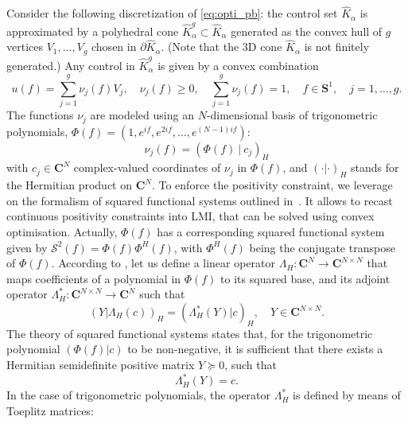 \documentclass[AMA,STIX1COL]{WileyNJD-v2}
\begin{document}
Consider the following %
discretization of \eqref{eq:opti_pb}: the control set $\hat{K}_{\alpha}$
is approximated by a polyhedral cone $\hat{K}^g_\alpha \subset \hat{K}_{\alpha}$
generated as the convex hull of $g$ vertices $V_1, \ldots, V_g$ chosen in $\partial \hat{K}_{\alpha}$.
(Note that the 3D cone $\hat{K}_\alpha$ is not finitely generated.)
Any control in $\hat{K}^g_\alpha$ is given by a convex combination
\begin{equation} \label{eq:u_trigo}
	u(f) = \sum_{j = 1}^{g} \nu_j(f) V_j, \quad
	\nu_j(f) \geq 0,\quad \sum_{j=1}^g  \nu_j(f)=1,\quad f \in \mathbf{S}^1,\quad j = 1,\ldots,g.
\end{equation}	
The functions $\nu_j$ are modeled using an $N$-dimensional basis of trigonometric polynomials, $\Phi(f) = \left(1, e^{i f}, e^{2 i f} , \ldots , e^{(N - 1) i f} \right)$:
\begin{equation}
	\label{eq:uj_nesterov}
	\nu_j(f) = \left( \Phi(f) \ |  \ c_j \right) _H 
\end{equation}
with $c_j \in \mathbf{C}^N$ complex-valued coordinates of $\nu_j$ in $\Phi(f)$, and $\left( \cdot | \cdot \right)_H$ stands for the Hermitian product on $\mathbf{C}^N$. To enforce the positivity constraint, we leverage on the formalism of squared functional systems outlined in~\cite{Nesterov_2000}. It allows to recast continuous positivity constraints into \ac{LMI}, that can be solved using convex optimisation.
%
Actually, $\Phi(f)$ has a corresponding squared functional system given by $\mathcal{S}^2(f) = \Phi(f) \Phi^H(f)$, with $\Phi^H(f)$ being the conjugate transpose of $\Phi(f)$. According to \cite{Nesterov_2000}, let us define a linear operator $\Lambda_H: \mathbf{C}^{N } \rightarrow \mathbf{C}^{N\times N}$  that maps coefficients of a polynomial in $\Phi(f)$ to its squared base, and its adjoint operator  $\Lambda^*_H: \mathbf{C}^{N \times N} \rightarrow \mathbf{C}^N$ such that
%
\begin{equation}
\left(  Y | \Lambda_H(c)  \right)_H = \left( \Lambda^*_H (Y) | c \right)_H, \quad Y \in \mathbf{C}^{N\times N}.
\label{eq:semidef_Y}
\end{equation}
%
The theory of squared functional systems states that, for
the trigonometric polynomial $(\Phi(f)|c)$ to be non-negative, it is sufficient that there exists
a Hermitian semidefinite positive matrix $Y \succeq 0$, such that%
%
$$ \Lambda^*_H(Y) = c. $$
%
In the case of trigonometric polynomials, the operator $\Lambda_H^*$ is defined by means of Toeplitz matrices:
\end{document}
